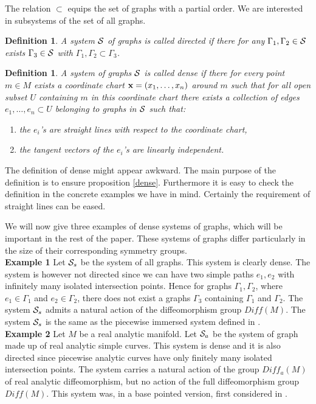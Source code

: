 \documentclass[12pt]{article}
\def\cs{{\cal S}}
\newtheorem{definition}[thm]{Definition}
\begin{document}
The relation $\subset$ equips the set of graphs with a partial order. We are interested in subsystems of the set of all graphs.

\begin{definition}
A system $\cs$ of graphs is called directed if there for any $\Gamma_1,\Gamma_2 \in \cs$ exists $\Gamma_3 \in \cs$ with $\Gamma_1 ,\Gamma_2 \subset \Gamma_3$.
\end{definition}
\begin{definition}
A system of graphs $\cs$ is called dense if there for every point $m\in M$ exists a coordinate chart ${\bf{x}}=(x_1,\ldots ,x_n)$ around $m$ such that for all open subset $U$ containing $m$ in this coordinate chart there exists a collection of edges $e_1,\ldots , e_n\subset U$ belonging to graphs in $\cs$ such that:
\begin{enumerate}
\item 
 the $e_i$'s are straight lines with respect to the coordinate chart,
\item
the tangent vectors of the $e_i$'s are linearly independent.
\end{enumerate}
\end{definition}

The definition of dense might appear awkward. The main purpose of the definition is to ensure proposition \ref{dense}. Furthermore it is easy to check the definition in the concrete examples we have in mind. Certainly the requirement of straight lines can be eased.

 We will now give three examples of dense systems of graphs, which will be important in the rest of the paper. These systems of graphs differ particularly in the size of their corresponding symmetry groups.\\


\textbf{Example 1} Let $\cs_s$ be the system of all graphs. This system is clearly dense. The system is however not directed since we can have two simple paths $e_1, e_2$ with infinitely many isolated intersection points. Hence for graphs $\Gamma_1 ,\Gamma_2$, where $e_1\in \Gamma_1$ and $e_2\in \Gamma_2$, there does not exist a graphs $\Gamma_3$ containing $\Gamma_1$ and $\Gamma_2$. The system $\cs_s$ admits a natural action of the diffeomorphism group $Diff(M)$. The system $\cs_s$ is the same as the piecewise immersed system defined in \cite{Fl1}.\\

\textbf{Example 2} Let $M$ be a real analytic manifold. Let $\cs_a$ be the system of graph made up of real analytic simple curves. This system is dense and it is also directed since piecewise analytic curves have only finitely many isolated intersection points. The system carries a natural action of the group $Diff_a(M)$ of real analytic diffeomorphism, but no action of the full diffeomorphism group $Diff (M)$. This system was, in a base pointed version, first considered in \cite{AL2}.\\
\end{document}
